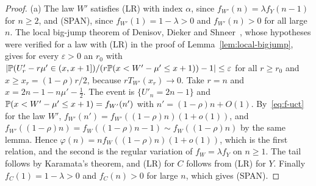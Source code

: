 \begin{proof}
(a) The law $W'$ satisfies (LR) with index $\alpha$, since $f_{W'}(n)=\lambda f_Y(n-1)$ for
$n\ge2$, and (SPAN), since $f_{W'}(1)=1-\lambda>0$ and $f_{W'}(n)>0$ for all large $n$. The
local big-jump theorem of Denisov, Dieker and Shneer~\cite[Theorem~9.1]{dds2008}, whose
hypotheses were verified for a law with (LR) in the proof of Lemma~\ref{lem:local-bigjump},
gives for every $\varepsilon>0$ an $r_0$ with
$|\mathbb{P}(U'_r-r\mu'\in(x,x+1])/(r\mathbb{P}(x<W'-\mu'\le x+1))-1|\le\varepsilon$ for all $r\ge r_0$
and $x\ge x_r=(1-\rho)r/2$, because $rT_{W'}(x_r)\to0$. Take $r=n$ and
$x=2n-1-n\mu'-\frac12$. The event is $\{U'_n=2n-1\}$ and
$\mathbb{P}(x<W'-\mu'\le x+1)=f_{W'}(n')$ with $n'=(1-\rho)n+O(1)$. By~\eqref{eq:f-uct} for the
law $W'$, $f_{W'}(n')=f_{W'}((1-\rho)n)(1+o(1))$, and $f_{W'}((1-\rho)n)=f_W((1-\rho)n-1)\sim f_W((1-\rho)n)$
by the same lemma. Hence $\varphi(n)=nf_W((1-\rho)n)(1+o(1))$, which is the first relation,
and the second is the regular variation of $f_W=\lambda f_Y$ on $n\ge1$. The tail follows by
Karamata's theorem, and (LR) for $C$ follows from (LR) for $Y$. Finally $f_C(1)=1-\lambda>0$ and
$f_C(n)>0$ for large $n$, which gives (SPAN).


\end{proof}
